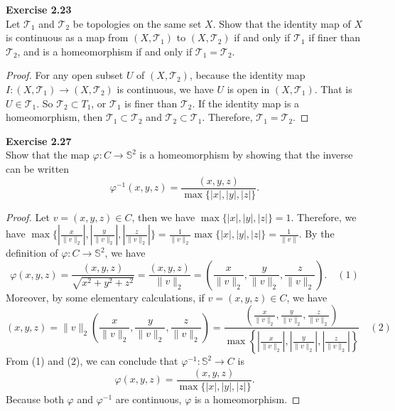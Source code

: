 \documentclass[12pt, a4paper]{article}
\theoremstyle{plain}
\newcommand{\set}[1]{\mathbb{#1}}
\newcommand{\T}{\mathcal{T}}
\newenvironment{exercise}[2][Exercise]
    { \begin{mdframed}[backgroundcolor=gray!20] \textbf{#1 #2} \\}
    {  \end{mdframed}}
\begin{document}
\begin{exercise}{2.23}
Let $\T_1$ and $\T_2$ be topologies on the same set $X$. Show that the identity map of  $X$ is continuous as a map from $(X,\T_1)$ to $(X,\T_2)$ if and only if $\T_1$ if finer than $\T_2$, and is a homeomorphism if and only if $\T_1=\T_2$.
\end{exercise}
	\begin{proof}
	For any open subset $U$ of $(X,\T_2)$, because the identity map $I:(X,\T_1)\rightarrow (X,\T_2)$ is continuous, we have $U$ is open in $(X,\T_1)$. That is $U\in \T_1$. So $\T_2\subset T_1$, or $\T_1$ is finer than $\T_2$. If the identity map is a homeomorphism, then $\T_1\subset \T_2$ and $\T_2\subset \T_1$. Therefore, $\T_1=\T_2$.
	\end{proof}
	
\begin{exercise}{2.27}
Show that the map $\varphi:C\rightarrow \set{S}^2$ is a homeomorphism by showing that the inverse can be written
\[
\varphi^{-1}(x,y,z)=\frac{(x,y,z)}{\max\{|x|,|y|,|z|\}}.
\]
\end{exercise}
	\begin{proof}
	Let $v=(x,y,z)\in C$, then we have $\max\{|x|,|y|,|z|\}=1$. Therefore, we have $\max\{|\frac{x}{\|v\|_2}|,|\frac{y}{\|v\|_2}|,|\frac{z}{\|v\|_2}|\}=\frac{1}{\|v\|_2}\max\{|x|,|y|,|z|\}=\frac{1}{\|v\|}$. By the definition of $\varphi:C\rightarrow\set{S}^2$, we have
	\[
	\varphi(x,y,z)=\frac{(x,y,z)}{\sqrt{x^2+y^2+z^2}}=\frac{(x,y,z)}{\|v\|_2}=\left(\frac{x}{\|v\|_2},\frac{y}{\|v\|_2},\frac{z}{\|v\|_2}\right).\quad (1)
	\]
	Moreover, by some elementary calculations, if $v=(x,y,z)\in C$, we have
	\[
	(x,y,z)=\|v\|_2\left(\frac{x}{\|v\|_2},\frac{y}{\|v\|_2},\frac{z}{\|v\|_2}\right)=\frac{\left(\frac{x}{\|v\|_2},\frac{y}{\|v\|_2},\frac{z}{\|v\|_2}\right)}{\max\left\{\left|\frac{x}{\|v\|_2}\right|,\left|\frac{y}{\|v\|_2}\right|,\left|\frac{z}{\|v\|_2}\right|\right\}}\quad (2)
	\]
	From (1) and (2), we can conclude that $\varphi^{-1}:\set{S}^2\rightarrow C$ is
	\[
	\varphi(x,y,z)=\frac{(x,y,z)}{\max\{|x|,|y|,|z|\}}.
	\]
	Because both $\varphi$ and $\varphi^{-1}$ are continuous, $\varphi$ is a homeomorphism.
	\end{proof}
	
\pagebreak
	
\end{document}
